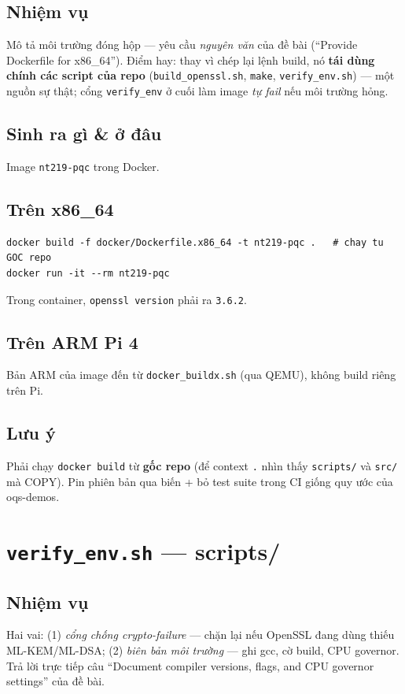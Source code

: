 \documentclass[11pt,a4paper]{article}
\begin{document}
\subsection*{Nhiệm vụ}
Mô tả môi trường đóng hộp — yêu cầu \emph{nguyên văn} của đề bài (``Provide Dockerfile for x86\_64''). Điểm hay: thay vì chép lại lệnh build, nó \textbf{tái dùng chính các script của repo} (\verb|build_openssl.sh|, \verb|make|, \verb|verify_env.sh|) — một nguồn sự thật; cổng \verb|verify_env| ở cuối làm image \emph{tự fail} nếu môi trường hỏng.

\subsection*{Sinh ra gì \& ở đâu}
Image \verb|nt219-pqc| trong Docker.

\subsection*{Trên x86\_64}
\begin{lstlisting}
docker build -f docker/Dockerfile.x86_64 -t nt219-pqc .   # chay tu GOC repo
docker run -it --rm nt219-pqc
\end{lstlisting}
Trong container, \verb|openssl version| phải ra \verb|3.6.2|.

\subsection*{Trên ARM Pi 4}
Bản ARM của image đến từ \verb|docker_buildx.sh| (qua QEMU), không build riêng trên Pi.

\subsection*{Lưu ý}
Phải chạy \verb|docker build| từ \textbf{gốc repo} (để context \verb|.| nhìn thấy \verb|scripts/| và \verb|src/| mà COPY). Pin phiên bản qua biến + bỏ test suite trong CI giống quy ước của oqs-demos.

\section{\texttt{verify\_env.sh} — \textmd{\normalsize scripts/}}

\subsection*{Nhiệm vụ}
Hai vai: (1) \emph{cổng chống crypto-failure} — chặn lại nếu OpenSSL đang dùng thiếu ML-KEM/ML-DSA; (2) \emph{biên bản môi trường} — ghi gcc, cờ build, CPU governor. Trả lời trực tiếp câu ``Document compiler versions, flags, and CPU governor settings'' của đề bài.
\end{document}
